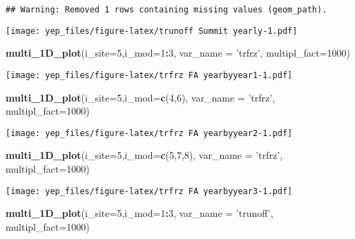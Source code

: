 \documentclass[]{article}
\newenvironment{Shaded}{\begin{snugshade}}{\end{snugshade}}
\newcommand{\DataTypeTok}[1]{\textcolor[rgb]{0.13,0.29,0.53}{#1}}
\newcommand{\DecValTok}[1]{\textcolor[rgb]{0.00,0.00,0.81}{#1}}
\newcommand{\KeywordTok}[1]{\textcolor[rgb]{0.13,0.29,0.53}{\textbf{#1}}}
\newcommand{\NormalTok}[1]{#1}
\newcommand{\OperatorTok}[1]{\textcolor[rgb]{0.81,0.36,0.00}{\textbf{#1}}}
\newcommand{\StringTok}[1]{\textcolor[rgb]{0.31,0.60,0.02}{#1}}
\begin{document}
\begin{verbatim}
## Warning: Removed 1 rows containing missing values (geom_path).
\end{verbatim}

\texttt{[image: yep\_files/figure-latex/trunoff Summit yearly-1.pdf]}

\begin{Shaded}
\begin{Highlighting}[]
\KeywordTok{multi_1D_plot}\NormalTok{(}\DataTypeTok{i_site=}\DecValTok{5}\NormalTok{,}\DataTypeTok{i_mod=}\DecValTok{1}\OperatorTok{:}\DecValTok{3}\NormalTok{, }\DataTypeTok{var_name =} \StringTok{'trfrz'}\NormalTok{,  }\DataTypeTok{multipl_fact=}\DecValTok{1000}\NormalTok{)  }
\end{Highlighting}
\end{Shaded}

\texttt{[image: yep\_files/figure-latex/trfrz FA yearbyyear1-1.pdf]}

\begin{Shaded}
\begin{Highlighting}[]
\KeywordTok{multi_1D_plot}\NormalTok{(}\DataTypeTok{i_site=}\DecValTok{5}\NormalTok{,}\DataTypeTok{i_mod=}\KeywordTok{c}\NormalTok{(}\DecValTok{4}\NormalTok{,}\DecValTok{6}\NormalTok{), }\DataTypeTok{var_name =} \StringTok{'trfrz'}\NormalTok{,  }\DataTypeTok{multipl_fact=}\DecValTok{1000}\NormalTok{)  }
\end{Highlighting}
\end{Shaded}

\texttt{[image: yep\_files/figure-latex/trfrz FA yearbyyear2-1.pdf]}

\begin{Shaded}
\begin{Highlighting}[]
\KeywordTok{multi_1D_plot}\NormalTok{(}\DataTypeTok{i_site=}\DecValTok{5}\NormalTok{,}\DataTypeTok{i_mod=}\KeywordTok{c}\NormalTok{(}\DecValTok{5}\NormalTok{,}\DecValTok{7}\NormalTok{,}\DecValTok{8}\NormalTok{), }\DataTypeTok{var_name =} \StringTok{'trfrz'}\NormalTok{,  }\DataTypeTok{multipl_fact=}\DecValTok{1000}\NormalTok{)  }
\end{Highlighting}
\end{Shaded}

\texttt{[image: yep\_files/figure-latex/trfrz FA yearbyyear3-1.pdf]}

\begin{Shaded}
\begin{Highlighting}[]
\KeywordTok{multi_1D_plot}\NormalTok{(}\DataTypeTok{i_site=}\DecValTok{5}\NormalTok{,}\DataTypeTok{i_mod=}\DecValTok{1}\OperatorTok{:}\DecValTok{3}\NormalTok{, }\DataTypeTok{var_name =} \StringTok{'trunoff'}\NormalTok{,  }\DataTypeTok{multipl_fact=}\DecValTok{1000}\NormalTok{)  }
\end{Highlighting}
\end{Shaded}
\end{document}
